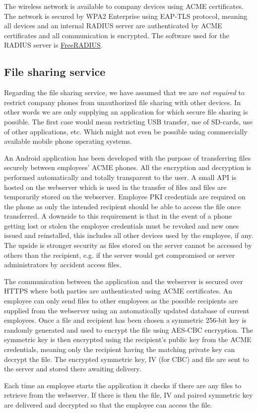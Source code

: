 The wireless network is available to company devices using ACME certificates. The network is secured by WPA2 Enterprise using EAP-TLS protocol, meaning all devices and an internal RADIUS server are authenticated by ACME certificates and all communication is encrypted. The software used for the RADIUS server is \href{http://freeradius.org/}{FreeRADIUS}.

\subsection*{File sharing service}

Regarding the file sharing service, we have assumed that we are \emph{not required} to restrict company phones from unauthorized file sharing with other devices. In other words we are only supplying an application for which secure file sharing is possible. The first case would mean restricting USB transfer, use of SD-cards, use of other applications, etc. Which might not even be possible using commercially available mobile phone operating systems.

An Android application has been developed with the purpose of transferring files securely between employees' ACME phones. All the encryption and decryption is performed automatically and totally transparent to the user. A small API is hosted on the webserver which is used in the transfer of files and files are temporarily stored on the webserver. Employee PKI credentials are required on the phone as only the intended recipient should be able to access the file once transferred. A downside to this requirement is that in the event of a phone getting lost or stolen the employee credentials must be revoked and new ones issued and reinstalled, this includes all other devices used by the employee, if any. The upside is stronger security as files stored on the server cannot be accessed by others than the recipient, e.g. if the server would get compromised or server administrators by accident access files.

The communication between the application and the webserver is secured over HTTPS where both parties are authenticated using ACME certificates. An employee can only send files to other employees as the possible recipients are supplied from the webserver using an automatically updated database of current employees. Once a file and recipient has been chosen a symmetric 256-bit key is randomly generated and used to encrypt the file using AES-CBC encryption. The symmetric key is then encrypted using the recipient's public key from the ACME credentials, meaning only the recipient having the matching private key can decrypt the file. The encrypted symmetric key, IV (for CBC) and file are sent to the server and stored there awaiting delivery.

Each time an employee starts the application it checks if there are any files to retrieve from the webserver. If there is then the file, IV and paired symmetric key are delivered and decrypted so that the employee can access the file.
